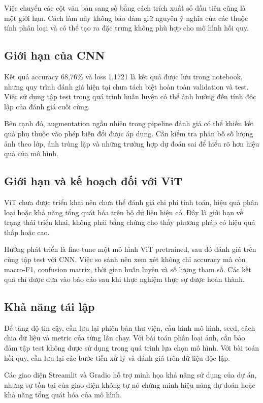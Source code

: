 \documentclass[runningheads]{llncs}
\begin{document}
Việc chuyển các cột văn bản sang số bằng cách trích
xuất số đầu tiên cũng là một giới hạn. Cách làm này
không bảo đảm giữ nguyên ý nghĩa của các thuộc tính
phân loại và có thể tạo ra đặc trưng không phù hợp
cho mô hình hồi quy.

\subsection{Giới hạn của CNN}

Kết quả accuracy 68,76\% và loss 1,1721 là kết quả
được lưu trong notebook, nhưng quy trình đánh giá
hiện tại chưa tách biệt hoàn toàn validation và test.
Việc sử dụng tập test trong quá trình huấn luyện có
thể ảnh hưởng đến tính độc lập của đánh giá cuối cùng.

Bên cạnh đó, augmentation ngẫu nhiên trong pipeline
đánh giá có thể khiến kết quả phụ thuộc vào phép biến
đổi được áp dụng. Cần kiểm tra phân bố số lượng ảnh
theo lớp, ảnh trùng lặp và những trường hợp dự đoán
sai để hiểu rõ hơn hiệu quả của mô hình.

\subsection{Giới hạn và kế hoạch đối với ViT}

ViT chưa được triển khai nên chưa thể đánh giá chi
phí tính toán, hiệu quả phân loại hoặc khả năng tổng
quát hóa trên bộ dữ liệu hiện có. Đây là giới hạn
về trạng thái triển khai, không phải bằng chứng cho
thấy phương pháp có hiệu quả thấp hoặc cao.

Hướng phát triển là fine-tune một mô hình ViT pretrained,
sau đó đánh giá trên cùng tập test với CNN. Việc so
sánh nên xem xét không chỉ accuracy mà còn macro-F1,
confusion matrix, thời gian huấn luyện và số lượng
tham số. Các kết quả chỉ được đưa vào báo cáo sau
khi thực nghiệm thực sự được hoàn thành.

\subsection{Khả năng tái lập}

Để tăng độ tin cậy, cần lưu lại phiên bản thư viện,
cấu hình mô hình, seed, cách chia dữ liệu và metric
của từng lần chạy. Với bài toán phân loại ảnh, cần
bảo đảm tập test không được sử dụng trong quá trình
lựa chọn mô hình. Với bài toán hồi quy, cần lưu lại
các bước tiền xử lý và đánh giá trên dữ liệu độc lập.

Các giao diện Streamlit và Gradio hỗ trợ minh họa
khả năng sử dụng của dự án, nhưng sự tồn tại của
giao diện không tự nó chứng minh hiệu năng dự đoán
hoặc khả năng tổng quát hóa của mô hình.
\end{document}
